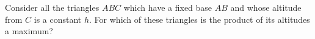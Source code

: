 Consider all the triangles $ABC$ which have a fixed base $AB$ and whose altitude from $C$ is a constant $h$. For which of these triangles is the product of its altitudes a maximum?